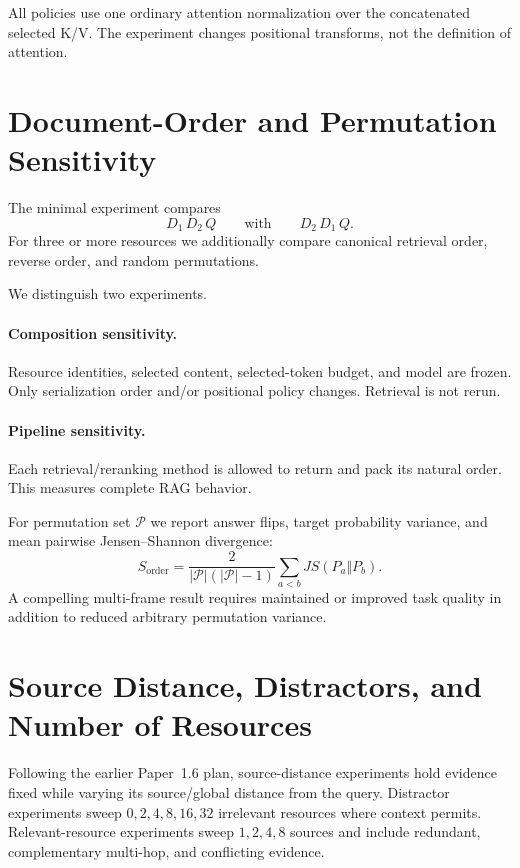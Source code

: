 \documentclass[11pt]{article}
\begin{document}
All policies use one ordinary attention normalization over the concatenated selected K/V.  The experiment changes positional transforms, not the definition of attention.

\section{Document-Order and Permutation Sensitivity}

The minimal experiment compares
\[
D_1\,D_2\,Q
\qquad\text{with}\qquad
D_2\,D_1\,Q.
\]
For three or more resources we additionally compare canonical retrieval order, reverse order, and random permutations.

We distinguish two experiments.

\paragraph{Composition sensitivity.}
Resource identities, selected content, selected-token budget, and model are frozen.  Only serialization order and/or positional policy changes.  Retrieval is not rerun.

\paragraph{Pipeline sensitivity.}
Each retrieval/reranking method is allowed to return and pack its natural order.  This measures complete RAG behavior.

For permutation set $\mathcal{P}$ we report answer flips, target probability variance, and mean pairwise Jensen--Shannon divergence:
\[
S_{\mathrm{order}}
=
\frac{2}{|\mathcal{P}|(|\mathcal{P}|-1)}
\sum_{a<b}
JS(P_a\Vert P_b).
\]
A compelling multi-frame result requires maintained or improved task quality in addition to reduced arbitrary permutation variance.

\section{Source Distance, Distractors, and Number of Resources}

Following the earlier Paper~1.6 plan, source-distance experiments hold evidence fixed while varying its source/global distance from the query.  Distractor experiments sweep $0,2,4,8,16,32$ irrelevant resources where context permits.  Relevant-resource experiments sweep $1,2,4,8$ sources and include redundant, complementary multi-hop, and conflicting evidence.
\end{document}
